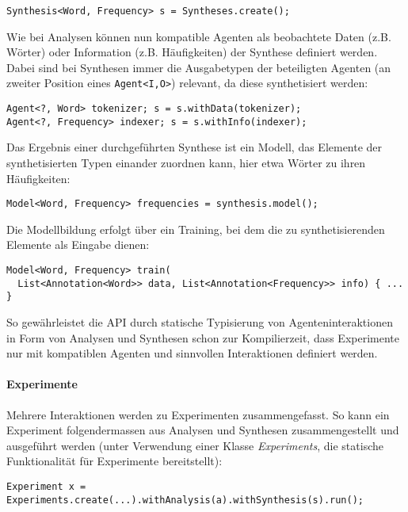 \documentclass[abstracton, 12pt]{scrartcl}
\begin{document}
\begin{lstlisting}
Synthesis<Word, Frequency> s = Syntheses.create();
\end{lstlisting}

Wie bei Analysen können nun kompatible Agenten als beobachtete Daten (z.B. Wörter) oder Information (z.B. Häufigkeiten) der Synthese definiert werden. Dabei sind bei Synthesen immer die Ausgabetypen der beteiligten Agenten (an zweiter Position eines \lstinline!Agent<I,O>!) relevant, da diese synthetisiert werden:

\begin{lstlisting}
Agent<?, Word> tokenizer; s = s.withData(tokenizer);
Agent<?, Frequency> indexer; s = s.withInfo(indexer);
\end{lstlisting}

Das Ergebnis einer durchgeführten Synthese ist ein Modell, das Elemente der synthetisierten Typen einander zuordnen kann, hier etwa Wörter zu ihren Häufigkeiten:

\begin{lstlisting}
Model<Word, Frequency> frequencies = synthesis.model();
\end{lstlisting}

Die Modellbildung erfolgt über ein Training, bei dem die zu synthetisierenden Elemente als Eingabe dienen:

\begin{lstlisting}
Model<Word, Frequency> train(
  List<Annotation<Word>> data, List<Annotation<Frequency>> info) { ... }
\end{lstlisting}

So gewährleistet die API durch statische Typisierung von Agenteninteraktionen in Form von Analysen und Synthesen schon zur Kompilierzeit, dass Experimente nur mit kompatiblen Agenten und sinnvollen Interaktionen definiert werden.

\paragraph{Experimente}

Mehrere Interaktionen werden zu Experimenten zusammengefasst. So kann ein Experiment folgendermassen aus Analysen und Synthesen zusammengestellt und ausgeführt werden (unter Verwendung einer Klasse \emph{Experiments}, die statische Funktionalität für Experimente bereitstellt):

\begin{lstlisting}
Experiment x = Experiments.create(...).withAnalysis(a).withSynthesis(s).run();
\end{lstlisting}
\end{document}
